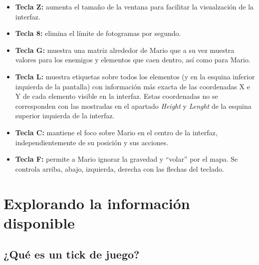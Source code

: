 \documentclass[10pt, spanish, pdftex]{../.memo/plantilla_memorias}
\begin{document}
\begin{itemize}
    \item \textbf{Tecla Z:} aumenta el tamaño de la ventana para facilitar la visualzación de la interfaz.
    \item \textbf{Tecla 8:} elimina el límite de fotogramas por segundo.
    \item \textbf{Tecla G:} muestra una matriz alrededor de Mario que a su vez muestra valores para los enemigos
                            y elementos que caen dentro, así como para Mario.
    \item \textbf{Tecla L:} muestra etiquetas sobre todos los elementos (y en la esquina inferior izquierda de la pantalla) con
                            información más exacta de las coordenadas X e Y de cada elemento visible en la interfaz. Estas coordenadas
                            no se corresponden con las mostradas en el apartado \textit{Height} y \textit{Lenght} de la esquina superior
                            izquierda de la interfaz.
    \item \textbf{Tecla C:} mantiene el foco sobre Mario en el centro de la interfaz, independientemente de su posición y sus acciones.
    \item \textbf{Tecla F:} permite a Mario ignorar la gravedad y ``volar'' por el mapa. Se controla arriba, abajo, izquierda, derecha
                            con las flechas del teclado.
\end{itemize}

\section{Explorando la información disponible}
\subsection{¿Qué es un tick de juego?}
\end{document}
